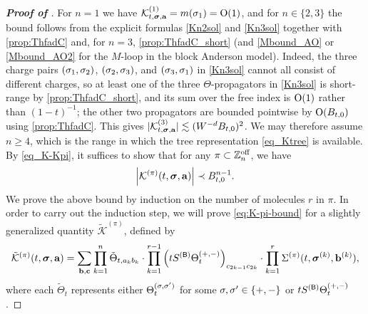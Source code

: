 \begin{proof}[\bf Proof of ]
For $n=1$ we have $\mathcal K^{(1)}_{t,{\boldsymbol{\sigma}},{\mathbf{a}}}=m(\sigma_1)=\operatorname{O}(1)$, and for $n\in\{2,3\}$ the bound follows from the explicit formulas \eqref{Kn2sol} and \eqref{Kn3sol} together with \eqref{prop:ThfadC} and, for $n=3$, \eqref{prop:ThfadC_short} (and \eqref{Mbound_AO} or \eqref{Mbound_AO2} for the $M$-loop in the block Anderson model). Indeed, the three charge pairs $(\sigma_1,\sigma_2)$, $(\sigma_2,\sigma_3)$, and $(\sigma_3,\sigma_1)$ in \eqref{Kn3sol} cannot all consist of different charges, so at least one of the three $\Theta$-propagators in \eqref{Kn3sol} is short-range by \eqref{prop:ThfadC_short}, and its sum over the free index is $\operatorname{O}(1)$ rather than $(1-t)^{-1}$; the other two propagators are bounded pointwise by $\operatorname{O}(B_{t,0})$ using \eqref{prop:ThfadC}. This gives $|\mathcal K^{(3)}_{t,{\boldsymbol{\sigma}},{\mathbf{a}}}|\lesssim (W^{-d}B_{t,0})^2$. We may therefore assume $n\ge 4$, which is the range in which the tree representation \eqref{eq_Ktree} is available.
By \eqref{eq_K-Kpi}, it suffices to show that for any $\pi \subset \mathbb{Z}^{\rm{off}}_n$, we have
\begin{equation}\label{eq:K-pi-bound}
    \left|\mathcal{K}^{(\pi)}(t, {\boldsymbol{\sigma}}, \mathbf{a})\right| \prec B_{t,0}^{n-1}.
\end{equation}
We prove the above bound by induction on the number of molecules $r$ in $\pi$. In order to carry out the induction step, we will prove \eqref{eq:K-pi-bound} for a slightly generalized quantity $\tilde{\mathcal{K}}^{(\pi)}$, defined by
\begin{equation}\label{eq:wtKpi}
    \tilde{\mathcal{K}}^{(\pi)}(t, {\boldsymbol{\sigma}}, \mathbf{a}) = \sum_{\mathbf{b},\mathbf{c}} \prod_{k=1}^n \tilde{\Theta}_{t,a_k b_k} \cdot \prod_{k=1}^{r-1} \left(tS^{({\mathsf{B}})}\Theta^{(+,-)}_{t}\right)_{c_{2k-1} c_{2k}} \cdot \prod_{k=1}^r \Sigma^{(\pi)}(t, {\boldsymbol{\sigma}}^{(k)}, \mathbf{b}^{(k)}),
\end{equation}
where each $\tilde{\Theta}_{t}$ represents either $\Theta^{(\sigma,\sigma')}_{t}$ for some $\sigma,\sigma'\in\{+,-\}$ or $tS^{({\mathsf{B}})}\Theta^{(+,-)}_{t}$.  


\end{proof}
